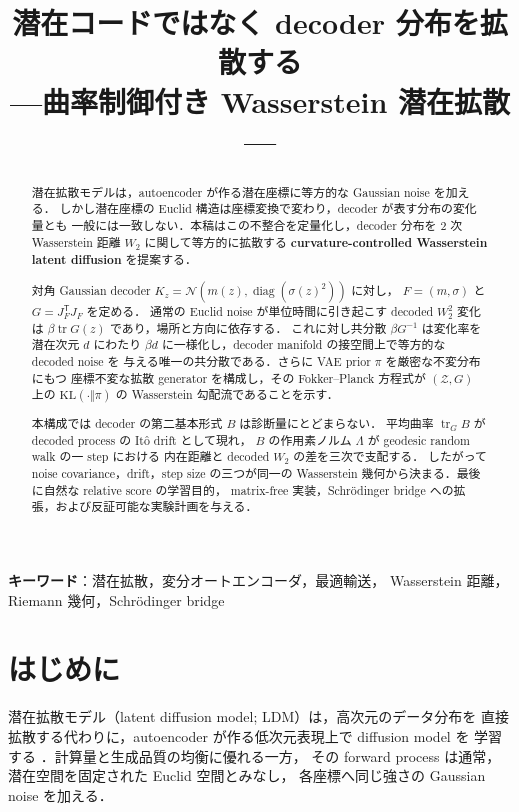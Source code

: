 \documentclass[uplatex,dvipdfmx,11pt,a4paper]{jsarticle}
\title{\textbf{潜在コードではなく decoder 分布を拡散する}\\
{\large ---曲率制御付き Wasserstein 潜在拡散---}}
\author{}
\date{}
\begin{document}
\maketitle

\begin{abstract}
\noindent
潜在拡散モデルは，autoencoder が作る潜在座標に等方的な Gaussian noise を加える．
しかし潜在座標の Euclid 構造は座標変換で変わり，decoder が表す分布の変化量とも
一般には一致しない．本稿はこの不整合を定量化し，decoder 分布を
$2$ 次 Wasserstein 距離 $W_2$ に関して等方的に拡散する
\textbf{curvature-controlled Wasserstein latent diffusion} を提案する．

対角 Gaussian decoder
$K_z=\mathcal{N}(m(z),\operatorname{diag}(\sigma(z)^2))$ に対し，
$F=(m,\sigma)$ と $G=J_F^{\mathsf T}J_F$ を定める．
通常の Euclid noise が単位時間に引き起こす decoded $W_2^2$ 変化は
$\beta\operatorname{tr}G(z)$ であり，場所と方向に依存する．
これに対し共分散 $\beta G^{-1}$ は変化率を潜在次元 $d$ にわたり
$\beta d$ に一様化し，decoder manifold の接空間上で等方的な decoded noise を
与える唯一の共分散である．さらに VAE prior $\pi$ を厳密な不変分布にもつ
座標不変な拡散 generator を構成し，その Fokker--Planck 方程式が
$(\mathcal{Z},G)$ 上の $\mathrm{KL}(\cdot\Vert\pi)$ の
Wasserstein 勾配流であることを示す．

本構成では decoder の第二基本形式 $B$ は診断量にとどまらない．
平均曲率 $\operatorname{tr}_G B$ が decoded process の It\^o drift として現れ，
$B$ の作用素ノルム $\Lambda$ が geodesic random walk の一 step における
内在距離と decoded $W_2$ の差を三次で支配する．
したがって noise covariance，drift，step size の三つが同一の
Wasserstein 幾何から決まる．最後に自然な relative score の学習目的，
matrix-free 実装，Schr\"odinger bridge への拡張，および反証可能な実験計画を与える．
\end{abstract}

\medskip
\noindent\textbf{キーワード}：潜在拡散，変分オートエンコーダ，最適輸送，
Wasserstein 距離，Riemann 幾何，Schr\"odinger bridge

\section{はじめに}
\label{sec:intro}

潜在拡散モデル（latent diffusion model; LDM）は，高次元のデータ分布を
直接拡散する代わりに，autoencoder が作る低次元表現上で diffusion model を
学習する \cite{rombach2022}．計算量と生成品質の均衡に優れる一方，
その forward process は通常，潜在空間を固定された Euclid 空間とみなし，
各座標へ同じ強さの Gaussian noise を加える．
\end{document}
